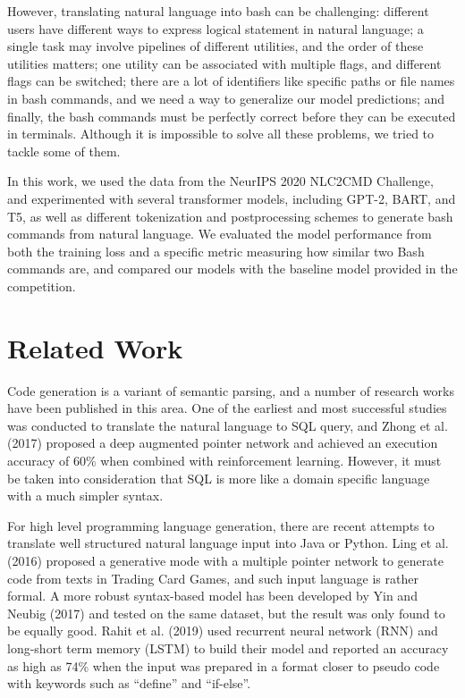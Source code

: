 \documentclass{article}
\begin{document}
However, translating natural language into bash can be challenging: different users have different ways to express logical statement in natural language; a single task may involve pipelines of different utilities, and the order of these utilities matters; one utility can be associated with multiple flags, and different flags can be switched; there are a lot of identifiers like specific paths or file names in bash commands, and we need a way to generalize our model predictions; and finally, the bash commands must be perfectly correct before they can be executed in terminals. Although it is impossible to solve all these problems, we tried to tackle some of them.

In this work, we used the data from the NeurIPS 2020 NLC2CMD Challenge, and experimented with several transformer models, including GPT-2, BART, and T5, as well as different tokenization and postprocessing schemes to generate bash commands from natural language. We evaluated the model performance from both the training loss and a specific metric measuring how similar two Bash commands are, and compared our models with the baseline model provided in the competition. 


\section{Related Work}
Code generation is a variant of semantic parsing, and a number of research works have been published in this area. One of the earliest and most successful studies was conducted to translate the natural language to SQL query, and Zhong et al. (2017) \cite{zhong2017seq2sql} proposed a deep augmented pointer network and achieved an execution accuracy of 60\% when combined with reinforcement learning. However, it must be taken into consideration that SQL is more like a domain specific language with a much simpler syntax.

For high level programming language generation, there are recent attempts to translate well structured natural language input into Java or Python.  Ling et al. (2016) \cite{ling2016latent} proposed a generative mode with a multiple pointer network to generate code from texts in Trading Card Games, and such input language is rather formal. A more robust syntax-based model has been developed by Yin and Neubig (2017) \cite{yin2017syntactic} and tested on the same dataset, but the result was only found to be equally good. Rahit et al. (2019) \cite{rahit2019machine} used recurrent neural network (RNN) and long-short term memory (LSTM) to build their model and reported an accuracy as high as 74\% when the input was prepared in a format closer to pseudo code with keywords such as “define” and “if-else”. 
\end{document}

